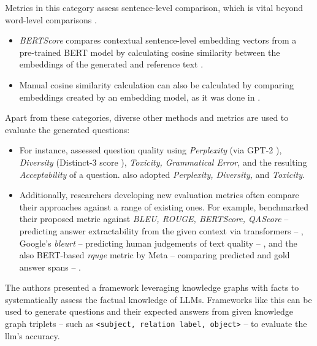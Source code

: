 
 Metrics in this category assess sentence-level comparison, which is vital beyond word-level comparisons \cite{guo_survey_2024}.
\begin{itemize}
   \item \textit{BERTScore} \cite{zhang_bertscore_2020} compares contextual sentence-level embedding vectors from a pre-trained BERT model by calculating cosine similarity between the embeddings of the generated and reference text \cite{guo_survey_2024}.
   \item Manual cosine similarity calculation can also be calculated by comparing embeddings created by an embedding model, as it was done in \cite{li_planning_2024}.
\end{itemize}

 Apart from these categories, diverse other methods and metrics are used to evaluate the generated questions:

\begin{itemize}
   \item For instance, \cite{wang_towards_2022} assessed question quality using \textit{Perplexity} (via GPT-2 \cite{radford_language_2019}), \textit{Diversity} (Distinct-3 score \cite{li_diversity-promoting_2016}), \textit{Toxicity, Grammatical Error,} and the resulting \textit{Acceptability} of a question. \cite{yang_heuristic_2024} also adopted \textit{Perplexity, Diversity,} and \textit{Toxicity}.
   \item Additionally, researchers developing new evaluation metrics often compare their approaches against a range of existing ones. For example, \cite{nguyen_reference-based_2024} benchmarked their proposed metric against \textit{BLEU, ROUGE, BERTScore, QAScore} -- predicting answer extractability from the given context via transformers -- \cite{ji_qascoreunsupervised_2022}, Google's \textit{\ac{bleurt}} -- predicting human judgements of text quality -- \cite{sellam_bleurt_2020}, and the also BERT-based \textit{\ac{rquge}} metric by Meta -- comparing predicted and gold answer spans -- \cite{mohammadshahi_rquge_2023}.
\end{itemize}


 The authors \cite{luo_systematic_2023} presented a framework leveraging knowledge graphs with facts to systematically assess the factual knowledge of LLMs. Frameworks like this can be used to generate questions and their expected answers from given knowledge graph triplets -- such as \texttt{<subject, relation label, object>} -- to evaluate the \ac{llm}'s accuracy.

